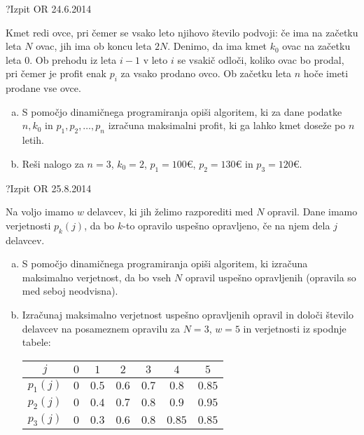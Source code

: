 \begin{naloga}{?}{Izpit OR 24.6.2014}
\begin{vprasanje}
Kmet redi ovce, pri čemer se vsako leto njihovo število podvoji:
če ima na začetku leta $N$ ovac, jih ima ob koncu leta $2N$.
Denimo, da ima kmet $k_0$ ovac na začetku leta $0$.
Ob prehodu iz leta $i-1$ v leto $i$ se vsakič odloči,
koliko ovac bo prodal, pri čemer je profit enak $p_i$ za vsako prodano ovco.
Ob začetku leta $n$ hoče imeti prodane vse ovce.

\begin{enumerate}[(a)]
\item S pomočjo dinamičnega programiranja opiši algoritem,
ki za dane podatke $n, k_0$ in $p_1, p_2, \dots, p_n$
izračuna maksimalni profit, ki ga lahko kmet doseže po $n$ letih.

\item Reši nalogo za $n = 3$, $k_0 = 2$,
$p_1 = 100 €$, $p_2 = 130 €$ in $p_3 = 120 €$.
\end{enumerate}
\end{vprasanje}
\begin{odgovor}
\end{odgovor}
\end{naloga}


\begin{naloga}{?}{Izpit OR 25.8.2014}
\begin{vprasanje}
Na voljo imamo $w$ delavcev, ki jih želimo razporediti med $N$ opravil.
Dane imamo verjetnosti $p_k(j)$,
da bo $k$-to opravilo uspešno opravljeno, če na njem dela $j$ delavcev.

\begin{enumerate}[(a)]
\item S pomočjo dinamičnega programiranja opiši algoritem,
ki izračuna maksimalno verjetnost,
da bo vseh $N$ opravil uspešno opravljenih (opravila so med seboj neodvisna).

\item Izračunaj maksimalno verjetnost uspešno opravljenih opravil
in določi število delavcev na posameznem opravilu
za $N = 3$, $w = 5$ in verjetnosti iz spodnje tabele:
\begin{center}
\begin{tabular}{c|cccccc}
$j$ & $0$ & $1$ & $2$ & $3$ & $4$ & $5$ \\ \hline
$p_1(j)$ & $0$ & $0.5$ & $0.6$ & $0.7$ & $0.8$  & $0.85$ \\
$p_2(j)$ & $0$ & $0.4$ & $0.7$ & $0.8$ & $0.9$  & $0.95$ \\
$p_3(j)$ & $0$ & $0.3$ & $0.6$ & $0.8$ & $0.85$ & $0.85$
\end{tabular}
\end{center}
\end{enumerate}
\end{vprasanje}
\begin{odgovor}
\end{odgovor}
\end{naloga}

